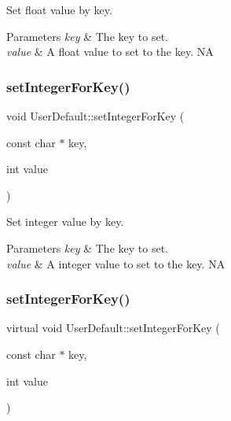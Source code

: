 Set float value by key. 
\begin{DoxyParams}{Parameters}
{\em key} & The key to set. \\
\hline
{\em value} & A float value to set to the key.  NA \\
\hline
\end{DoxyParams}
\mbox{\label{classUserDefault_a4fbe77ef7b5ed9e7f69f8267034d6ebd}} 
\subsubsection{\texorpdfstring{set\+Integer\+For\+Key()}{setIntegerForKey()}\hspace{0.1cm}{\footnotesize\ttfamily [1/2]}}
{\footnotesize\ttfamily void User\+Default\+::set\+Integer\+For\+Key (\begin{DoxyParamCaption}\item[{const char $\ast$}]{key,  }\item[{int}]{value }\end{DoxyParamCaption})\hspace{0.3cm}{\ttfamily [virtual]}}

Set integer value by key. 
\begin{DoxyParams}{Parameters}
{\em key} & The key to set. \\
\hline
{\em value} & A integer value to set to the key.  NA \\
\hline
\end{DoxyParams}
\mbox{\label{classUserDefault_a05d2e093416141bcbf1ab2fcf8aedc5f}} 
\subsubsection{\texorpdfstring{set\+Integer\+For\+Key()}{setIntegerForKey()}\hspace{0.1cm}{\footnotesize\ttfamily [2/2]}}
{\footnotesize\ttfamily virtual void User\+Default\+::set\+Integer\+For\+Key (\begin{DoxyParamCaption}\item[{const char $\ast$}]{key,  }\item[{int}]{value }\end{DoxyParamCaption})\hspace{0.3cm}{\ttfamily [virtual]}}

